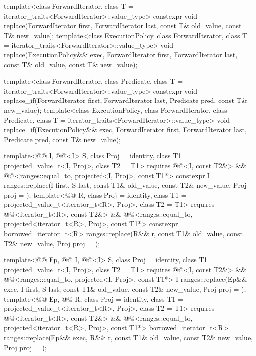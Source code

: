 %
%
\begin{itemdecl}
template<class ForwardIterator, class T = iterator_traits<ForwardIterator>::value_type>
  constexpr void replace(ForwardIterator first, ForwardIterator last,
                         const T& old_value, const T& new_value);
template<class ExecutionPolicy, class ForwardIterator,
         class T = iterator_traits<ForwardIterator>::value_type>
  void replace(ExecutionPolicy&& exec,
               ForwardIterator first, ForwardIterator last,
               const T& old_value, const T& new_value);

template<class ForwardIterator, class Predicate,
         class T = iterator_traits<ForwardIterator>::value_type>
  constexpr void replace_if(ForwardIterator first, ForwardIterator last,
                            Predicate pred, const T& new_value);
template<class ExecutionPolicy, class ForwardIterator, class Predicate,
         class T = iterator_traits<ForwardIterator>::value_type>
  void replace_if(ExecutionPolicy&& exec,
                  ForwardIterator first, ForwardIterator last,
                  Predicate pred, const T& new_value);

template<@@ I, @@<I> S, class Proj = identity,
         class T1 = projected_value_t<I, Proj>, class T2 = T1>
  requires @@<I, const T2&> &&
           @@<ranges::equal_to, projected<I, Proj>, const T1*>
  constexpr I
    ranges::replace(I first, S last, const T1& old_value, const T2& new_value, Proj proj = {});
template<@@ R, class Proj = identity,
         class T1 = projected_value_t<iterator_t<R>, Proj>, class T2 = T1>
  requires @@<iterator_t<R>, const T2&> &&
           @@<ranges::equal_to, projected<iterator_t<R>, Proj>, const T1*>
  constexpr borrowed_iterator_t<R>
    ranges::replace(R&& r, const T1& old_value, const T2& new_value, Proj proj = {});

template<@@ Ep, @@ I, @@<I> S,
         class Proj = identity, class T1 = projected_value_t<I, Proj>, class T2 = T1>
  requires @@<I, const T2&> &&
           @@<ranges::equal_to, projected<I, Proj>, const T1*>
  I ranges::replace(Ep&& exec, I first, S last,
                    const T1& old_value, const T2& new_value, Proj proj = {});
template<@@ Ep, @@ R, class Proj = identity,
         class T1 = projected_value_t<iterator_t<R>, Proj>, class T2 = T1>
  requires @@<iterator_t<R>, const T2&> &&
            @@<ranges::equal_to,
                                      projected<iterator_t<R>, Proj>, const T1*>
  borrowed_iterator_t<R>
    ranges::replace(Ep&& exec, R&& r, const T1& old_value, const T2& new_value,
                    Proj proj = {});


\end{itemdecl}
